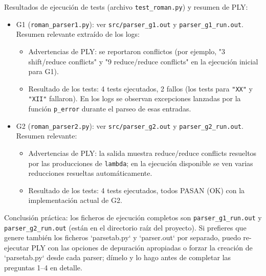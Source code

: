 \documentclass[a4paper,11pt]{article}
\begin{document}
Resultados de ejecución de tests (archivo \texttt{test\_roman.py}) y resumen de PLY:
\begin{itemize}
  \item G1 (\texttt{roman\_parser1.py}): ver \texttt{src/parser\_g1.out} y \texttt{parser\_g1\_run.out}. Resumen relevante extraído de los logs:
  \begin{itemize}
  \item Advertencias de PLY: se reportaron conflictos (por ejemplo, "3 shift/reduce conflicts" y "9 reduce/reduce conflicts" en la ejecución inicial para G1).
  \item Resultado de los tests: 4 tests ejecutados, 2 fallos (los tests para \texttt{"XX"} y \texttt{"XII"} fallaron). En los logs se observan excepciones lanzadas por la función \texttt{p\_error} durante el parseo de esas entradas.
  \end{itemize}
  \item G2 (\texttt{roman\_parser2.py}): ver \texttt{src/parser\_g2.out} y \texttt{parser\_g2\_run.out}. Resumen relevante:
  \begin{itemize}
  \item Advertencias de PLY: la salida muestra reduce/reduce conflicts resueltos por las producciones de \texttt{lambda}; en la ejecución disponible se ven varias reducciones resueltas automáticamente.
  \item Resultado de los tests: 4 tests ejecutados, todos PASAN (OK) con la implementación actual de G2.
  \end{itemize}
\end{itemize}

Conclusión práctica: los ficheros de ejecución completos son \texttt{parser\_g1\_run.out} y \texttt{parser\_g2\_run.out} (están en el directorio raíz del proyecto). Si prefieres que genere también los ficheros `parsetab.py` y `parser.out` por separado, puedo re-ejecutar PLY con las opciones de depuración apropiadas o forzar la creación de `parsetab.py` desde cada parser; dímelo y lo hago antes de completar las preguntas 1–4 en detalle.
\end{document}
